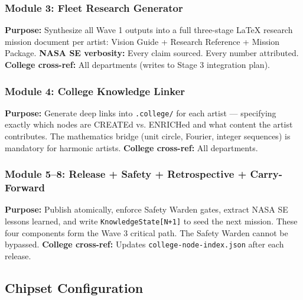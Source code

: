 \documentclass[11pt,letterpaper]{article}
\begin{document}
\subsubsection{Module 3: Fleet Research Generator}
\textbf{Purpose:} Synthesize all Wave 1 outputs into a full three-stage LaTeX research
mission document per artist: Vision Guide + Research Reference + Mission Package.
\textbf{NASA SE verbosity:} Every claim sourced. Every number attributed.
\textbf{College cross-ref:} All departments (writes to Stage 3 integration plan).

\subsubsection{Module 4: College Knowledge Linker}
\textbf{Purpose:} Generate deep links into \texttt{.college/} for each artist --- specifying
exactly which nodes are CREATEd vs. ENRICHed and what content the artist contributes.
The mathematics bridge (unit circle, Fourier, integer sequences) is mandatory for harmonic artists.
\textbf{College cross-ref:} All departments.

\subsubsection{Module 5--8: Release + Safety + Retrospective + Carry-Forward}
\textbf{Purpose:} Publish atomically, enforce Safety Warden gates, extract NASA SE lessons
learned, and write \texttt{KnowledgeState[N+1]} to seed the next mission. These four components
form the Wave 3 critical path. The Safety Warden cannot be bypassed.
\textbf{College cross-ref:} Updates \texttt{college-node-index.json} after each release.

\subsection{Chipset Configuration}
\end{document}
